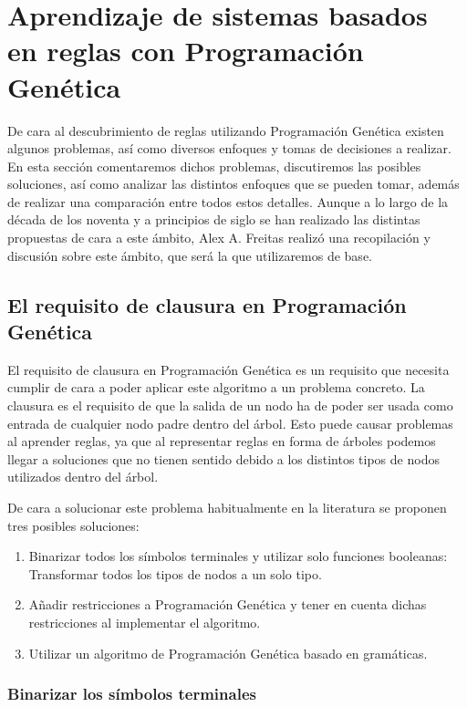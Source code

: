 \section{Aprendizaje de sistemas basados en reglas con Programación Genética}

De cara al descubrimiento de reglas utilizando Programación Genética existen algunos problemas, así como diversos enfoques y tomas de decisiones a realizar. En esta sección comentaremos dichos problemas, discutiremos las posibles soluciones, así como analizar las distintos enfoques que se pueden tomar, además de realizar una comparación entre todos estos detalles. Aunque a lo largo de la década de los noventa y a principios de siglo se han realizado las distintas propuestas de cara a este ámbito, Alex A. Freitas \cite{dataMiningDescubrimientoReglasGeneticos} realizó una recopilación y discusión sobre este ámbito, que será la que utilizaremos de base.


\subsection{El requisito de clausura en Programación Genética}

El requisito de clausura en Programación Genética es un requisito que necesita cumplir de cara a poder aplicar este algoritmo a un problema concreto. La clausura es el requisito de que la salida de un nodo ha de poder ser usada como entrada de cualquier nodo padre dentro del árbol. Esto puede causar problemas al aprender reglas, ya que al representar reglas en forma de árboles podemos llegar a soluciones que no tienen sentido debido a los distintos tipos de nodos utilizados dentro del árbol.

De cara a solucionar este problema habitualmente en la literatura se proponen tres posibles soluciones:

\begin{enumerate}
	\item Binarizar todos los símbolos terminales y utilizar solo funciones booleanas: Transformar todos los tipos de nodos a un solo tipo.
	\item Añadir restricciones a Programación Genética y tener en cuenta dichas restricciones al implementar el algoritmo.
	\item Utilizar un algoritmo de Programación Genética basado en gramáticas.
\end{enumerate}

\subsubsection{Binarizar los símbolos terminales}

